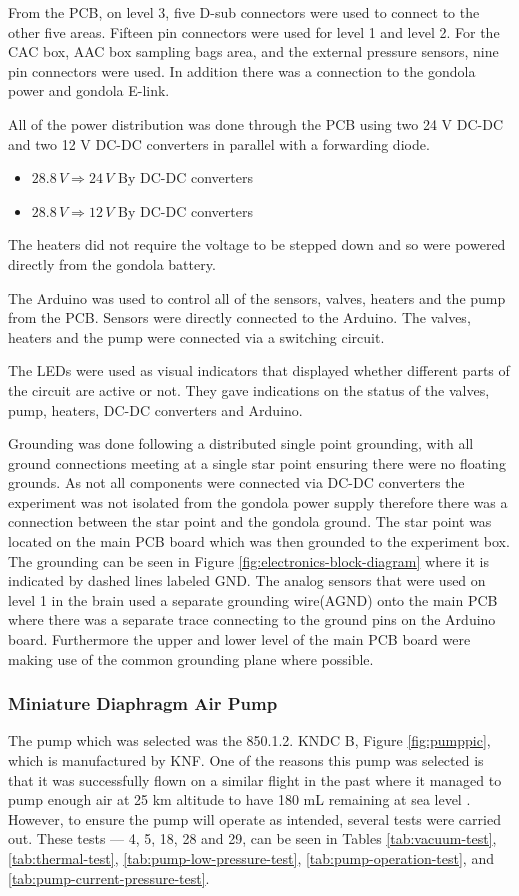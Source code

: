 From the PCB, on level 3, five D-sub connectors were used to connect to the other five areas. Fifteen pin connectors were used for level 1 and level 2. For the CAC box, AAC box sampling bags area, and the external pressure sensors, nine pin connectors were used. In addition there was a connection to the gondola power and gondola E-link.

All of the power distribution was done through the PCB using two 24 V DC-DC and two 12 V DC-DC converters in parallel with a forwarding diode.  
\begin{itemize}
  \item $28.8 \, V \Longrightarrow 24 \, V $ By DC-DC converters
  \item $28.8 \, V \Longrightarrow 12 \, V$ By DC-DC converters
  \end{itemize}
The heaters did not require the voltage to be stepped down and so were powered directly from the gondola battery.

The Arduino was used to control all of the sensors, valves, heaters and the pump from the PCB. Sensors were directly connected to the Arduino. The valves, heaters and the pump were connected via a switching circuit.

The LEDs were used as visual indicators that displayed whether different parts of the circuit are active or not. They gave indications on the status of the valves, pump, heaters, DC-DC converters and Arduino. 

Grounding was done following a distributed single point grounding, with all ground connections meeting at a single star point ensuring there were no floating grounds. As not all components were connected via DC-DC converters the experiment was not isolated from the gondola power supply therefore there was a connection between the star point and the gondola ground. The star point was located on the main PCB board which was then grounded to the experiment box. The grounding can be seen in Figure \ref{fig:electronics-block-diagram} where it is indicated by dashed lines labeled GND. The analog sensors that were used on level 1 in the brain used a separate grounding wire(AGND) onto the main PCB where there was a separate trace connecting to the ground pins on the Arduino board. Furthermore  the  upper  and  lower  level  of  the  main PCB board were making use of the common grounding plane where possible.

\subsubsection{Miniature Diaphragm Air Pump}
The pump which was selected was the 850.1.2. KNDC B, Figure \ref{fig:pumppic}, which is manufactured by KNF. One of the reasons this pump was selected is that it was successfully flown on a similar flight in the past where it managed to pump enough air at 25 km altitude to have 180 mL remaining at sea level \cite{LISA}. However, to ensure the pump will operate as intended, several tests were carried out. These tests --- 4, 5, 18, 28 and 29, can be seen in Tables \ref{tab:vacuum-test}, \ref{tab:thermal-test}, \ref{tab:pump-low-pressure-test}, \ref{tab:pump-operation-test}, and \ref{tab:pump-current-pressure-test}.

